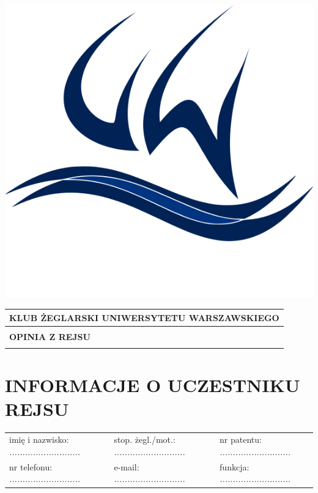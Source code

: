 \documentclass{article}
\author{Andrzej Gwiazda}
\begin{document}
\newpage
\begin{minipage}{0.11\textwidth}
\includegraphics[width=\textwidth]{logo.png}
\end{minipage}
\begin{minipage}{0.89\textwidth}
\begin{tabularx}{\textwidth} { 
  | >{\centering\arraybackslash}X | }
 \hline
 \textbf{KLUB ŻEGLARSKI UNIWERSYTETU WARSZAWSKIEGO} \\
 \hline
 \\
 \textbf{\huge OPINIA Z REJSU} \\
 \\
\hline
\end{tabularx}
\end{minipage}

\section*{INFORMACJE O UCZESTNIKU REJSU}
\begin{tabularx}{\textwidth}{X X X}
imię i nazwisko: \textit{...........................} & stop. żegl./mot.: \textit{...........................} & nr patentu: \textit{...........................} \\
nr telefonu: \textit{...........................} & e-mail: \textit{...........................} & funkcja: \textit{...........................} \\
\end{tabularx}
\end{document}
